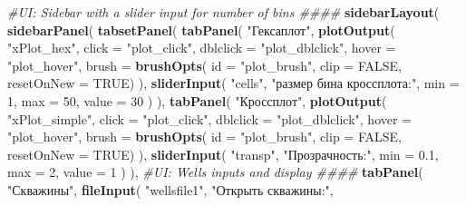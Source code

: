 \documentclass[]{article}
\newenvironment{Shaded}{\begin{snugshade}}{\end{snugshade}}
\newcommand{\KeywordTok}[1]{\textcolor[rgb]{0.13,0.29,0.53}{\textbf{#1}}}
\newcommand{\DataTypeTok}[1]{\textcolor[rgb]{0.13,0.29,0.53}{#1}}
\newcommand{\DecValTok}[1]{\textcolor[rgb]{0.00,0.00,0.81}{#1}}
\newcommand{\FloatTok}[1]{\textcolor[rgb]{0.00,0.00,0.81}{#1}}
\newcommand{\StringTok}[1]{\textcolor[rgb]{0.31,0.60,0.02}{#1}}
\newcommand{\CommentTok}[1]{\textcolor[rgb]{0.56,0.35,0.01}{\textit{#1}}}
\newcommand{\OtherTok}[1]{\textcolor[rgb]{0.56,0.35,0.01}{#1}}
\newcommand{\NormalTok}[1]{#1}
\begin{document}
\begin{Shaded}
\begin{Highlighting}[]
  
  \CommentTok{#UI: Sidebar with a slider input for number of bins ####}
  \KeywordTok{sidebarLayout}\NormalTok{(}
    \KeywordTok{sidebarPanel}\NormalTok{(}
      \KeywordTok{tabsetPanel}\NormalTok{(}
        \KeywordTok{tabPanel}\NormalTok{( }\StringTok{"Гексаплот"}\NormalTok{,}
          \KeywordTok{plotOutput}\NormalTok{(}
            \StringTok{"xPlot_hex"}\NormalTok{,}
            \DataTypeTok{click =} \StringTok{"plot_click"}\NormalTok{,}
            \DataTypeTok{dblclick =} \StringTok{"plot_dblclick"}\NormalTok{,}
            \DataTypeTok{hover =} \StringTok{"plot_hover"}\NormalTok{,}
            \DataTypeTok{brush =} \KeywordTok{brushOpts}\NormalTok{( }\DataTypeTok{id =} \StringTok{"plot_brush"}\NormalTok{, }\DataTypeTok{clip =} \OtherTok{FALSE}\NormalTok{, }\DataTypeTok{resetOnNew =} \OtherTok{TRUE}\NormalTok{)}
\NormalTok{          ),}
          \KeywordTok{sliderInput}\NormalTok{(}
            \StringTok{"cells"}\NormalTok{,}
            \StringTok{"размер бина кроссплота:"}\NormalTok{,}
            \DataTypeTok{min =} \DecValTok{1}\NormalTok{,}
            \DataTypeTok{max =} \DecValTok{50}\NormalTok{,}
            \DataTypeTok{value =} \DecValTok{30}
\NormalTok{          )}
\NormalTok{          ),}
          \KeywordTok{tabPanel}\NormalTok{( }\StringTok{"Кроссплот"}\NormalTok{,}
                  \KeywordTok{plotOutput}\NormalTok{(}
                    \StringTok{"xPlot_simple"}\NormalTok{,}
                    \DataTypeTok{click =} \StringTok{"plot_click"}\NormalTok{,}
                    \DataTypeTok{dblclick =} \StringTok{"plot_dblclick"}\NormalTok{,}
                    \DataTypeTok{hover =} \StringTok{"plot_hover"}\NormalTok{,}
                    \DataTypeTok{brush =} \KeywordTok{brushOpts}\NormalTok{( }\DataTypeTok{id =} \StringTok{"plot_brush"}\NormalTok{, }\DataTypeTok{clip =} \OtherTok{FALSE}\NormalTok{, }\DataTypeTok{resetOnNew =} \OtherTok{TRUE}\NormalTok{)}
\NormalTok{                  ),}
            \KeywordTok{sliderInput}\NormalTok{(}
              \StringTok{"transp"}\NormalTok{,}
              \StringTok{"Прозрачность:"}\NormalTok{,}
              \DataTypeTok{min =} \FloatTok{0.1}\NormalTok{,}
              \DataTypeTok{max =} \DecValTok{2}\NormalTok{,}
              \DataTypeTok{value =} \DecValTok{1}
\NormalTok{            )}
\NormalTok{          ),}
        \CommentTok{#UI: Wells inputs and display ####}
        \KeywordTok{tabPanel}\NormalTok{(}
          \StringTok{"Скважины"}\NormalTok{,}
          \KeywordTok{fileInput}\NormalTok{(}
            \StringTok{"wellsfile1"}\NormalTok{,}
            \StringTok{"Открыть скважины:"}\NormalTok{,}

\end{Highlighting}
\end{Shaded}
\end{document}
